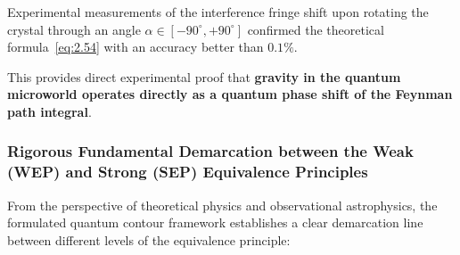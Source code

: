 Experimental measurements of the interference fringe shift upon rotating the crystal through an angle $\alpha \in [-90^\circ, +90^\circ]$ confirmed the theoretical formula~\eqref{eq:2.54} with an accuracy better than $0.1\%$.

This provides direct experimental proof that \textbf{gravity in the quantum microworld operates directly as a quantum phase shift of the Feynman path integral}.

\subsubsection{Rigorous Fundamental Demarcation between the Weak (WEP) and Strong (SEP) Equivalence Principles}\label{sec:2.5.4}

From the perspective of theoretical physics and observational astrophysics, the formulated quantum contour framework establishes a clear demarcation line between different levels of the equivalence principle:

